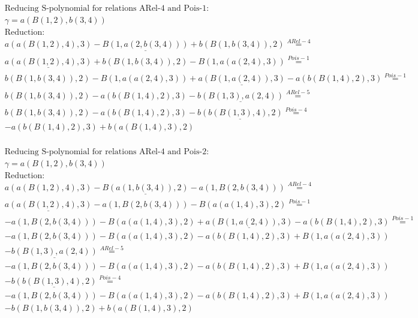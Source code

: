 \documentclass[11pt]{amsart}
\begin{document}
\begin{align*} 
& \text{Reducing S-polynomial for relations ARel-4 and Pois-1:} \\ 
& \gamma = a(B(1,2),b(3,4)) \\ 
& \text{Reduction}: \\&a(a(B(1,2),4),3) - \underline{B(1,a(2,b(3,4)))} + b(B(1,b(3,4)),2) \stackrel{ ARel-4 }{=}  \\ 
&\underline{a(a(B(1,2),4),3)} + b(B(1,b(3,4)),2) - B(1,a(a(2,4),3)) \stackrel{ Pois-1 }{=}  \\ 
&b(B(1,b(3,4)),2) - B(1,a(a(2,4),3)) + \underline{a(B(1,a(2,4)),3)} - a(b(B(1,4),2),3) \stackrel{ Pois-1 }{=}  \\ 
&b(B(1,b(3,4)),2) - a(b(B(1,4),2),3) - \underline{b(B(1,3),a(2,4))} \stackrel{ ARel-5 }{=}  \\ 
&b(B(1,b(3,4)),2) - a(b(B(1,4),2),3) - \underline{b(b(B(1,3),4),2)} \stackrel{ Pois-4 }{=}  \\ 
& - a(b(B(1,4),2),3) + b(a(B(1,4),3),2)\\ 
\end{align*} 
 
\begin{align*} 
& \text{Reducing S-polynomial for relations ARel-4 and Pois-2:} \\ 
& \gamma = a(B(1,2),b(3,4)) \\ 
& \text{Reduction}: \\&a(a(B(1,2),4),3) - \underline{B(a(1,b(3,4)),2)} - a(1,B(2,b(3,4))) \stackrel{ ARel-4 }{=}  \\ 
&\underline{a(a(B(1,2),4),3)} - a(1,B(2,b(3,4))) - B(a(a(1,4),3),2) \stackrel{ Pois-1 }{=}  \\ 
& - a(1,B(2,b(3,4))) - B(a(a(1,4),3),2) + \underline{a(B(1,a(2,4)),3)} - a(b(B(1,4),2),3) \stackrel{ Pois-1 }{=}  \\ 
& - a(1,B(2,b(3,4))) - B(a(a(1,4),3),2) - a(b(B(1,4),2),3) + B(1,a(a(2,4),3))\\ 
 &  - \underline{b(B(1,3),a(2,4))} \stackrel{ ARel-5 }{=}  \\ 
& - a(1,B(2,b(3,4))) - B(a(a(1,4),3),2) - a(b(B(1,4),2),3) + B(1,a(a(2,4),3))\\ 
 &  - \underline{b(b(B(1,3),4),2)} \stackrel{ Pois-4 }{=}  \\ 
& - a(1,B(2,b(3,4))) - B(a(a(1,4),3),2) - a(b(B(1,4),2),3) + B(1,a(a(2,4),3))\\ 
 &  - b(B(1,b(3,4)),2) + b(a(B(1,4),3),2)\\ 
\end{align*} 
 
\end{document}
